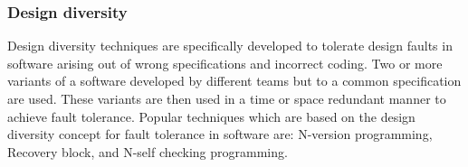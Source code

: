 \documentclass[a4paper, 11pt]{article}
\newcommand{\cmark}{\ding{51}}%
\begin{document}
%


\subsubsection{Design diversity}
Design diversity techniques are specifically developed to tolerate design faults in software arising out of wrong specifications and incorrect coding. Two or more variants of a software developed by different teams but to a common specification are used. These variants are then used in a time or space redundant manner to achieve fault tolerance. Popular techniques which are based on the design diversity concept for fault tolerance in software are: N-version programming, Recovery block, and N-self checking programming.
\end{document}
